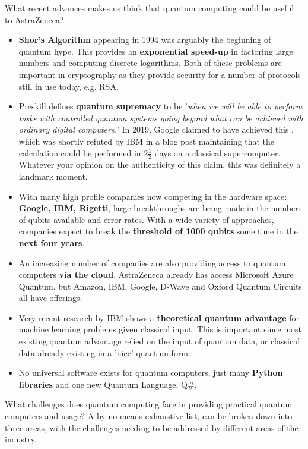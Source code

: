 \documentclass{article}
\theoremstyle{definition}
\begin{document}
What recent advances makes us think that quantum computing could be useful to AstraZeneca? 
\begin{itemize}
    \item \textbf{Shor's Algorithm} \cite{Shor_1997} appearing in 1994 was arguably the beginning of quantum hype. This provides an \textbf{exponential speed-up} in factoring large numbers and computing discrete logarithms. Both of these problems are important in cryptography as they provide security for a number of protocols still in use today, e.g. RSA.
    \item Preskill \cite{preskill2012quantum} defines \textbf{quantum supremacy} to be '\textit{when we will be able to perform tasks with controlled quantum systems going beyond what can be achieved with ordinary digital computers.}' In 2019, Google claimed to have achieved this \cite{quantum_supremacy}, which was shortly refuted by IBM \cite{ibm_refute} in a blog post maintaining that the calculation could be performed in $2 \frac{1}{2}$ days on a classical supercomputer. Whatever your opinion on the authenticity of this claim, this was definitely a landmark moment.
    \item With many high profile companies now competing in the hardware space: \textbf{Google, IBM, Rigetti}, large breakthroughs are being made in the numbers of qubits available and error rates. With a wide variety of approaches, companies expect to break the \textbf{threshold of 1000 qubits} some time in the \textbf{next four years}. 
    \item An increasing number of companies are also providing access to quantum computers \textbf{via the cloud}. AstraZeneca already has access Microsoft Azure Quantum, but Amazon, IBM, Google, D-Wave and Oxford Quantum Circuits all have offerings.
    \item Very recent research by IBM \cite{Liu_2021} shows a \textbf{theoretical quantum advantage} for machine learning problems given classical input. This is important since most existing quantum advantage relied on the input of quantum data, or classical data already existing in a 'nice' quantum form. 
    \item  No universal software exists for quantum computers, just many \textbf{Python libraries} and one new Quantum Language, Q\#. 
\end{itemize}

What challenges does quantum computing face in providing practical quantum computers and usage? A by no means exhaustive list, can be broken down into three areas, with the challenges needing to be addressed by different areas of the industry. 
\end{document}
